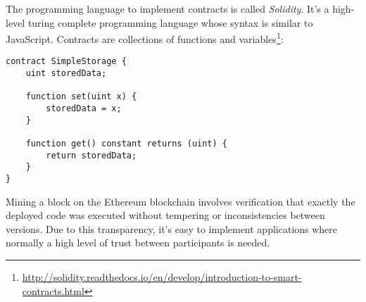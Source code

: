 The programming language to implement contracts is called \textit{Solidity}. It's a high-level turing complete programming language whose syntax is similar to JavaScript. Contracts are collections of functions and variables\footnote{\url{http://solidity.readthedocs.io/en/develop/introduction-to-smart-contracts.html}}:
\vspace{0.3cm}
\begin{lstlisting}
contract SimpleStorage {
    uint storedData;

    function set(uint x) {
        storedData = x;
    }

    function get() constant returns (uint) {
        return storedData;
    }
}
\end{lstlisting}
\vspace{0.3cm}
Mining a block on the Ethereum blockchain involves verification that exactly the deployed code was executed without tempering or inconsistencies between versions. Due to this transparency, it's easy to implement applications where normally a high level of trust between participants is needed.